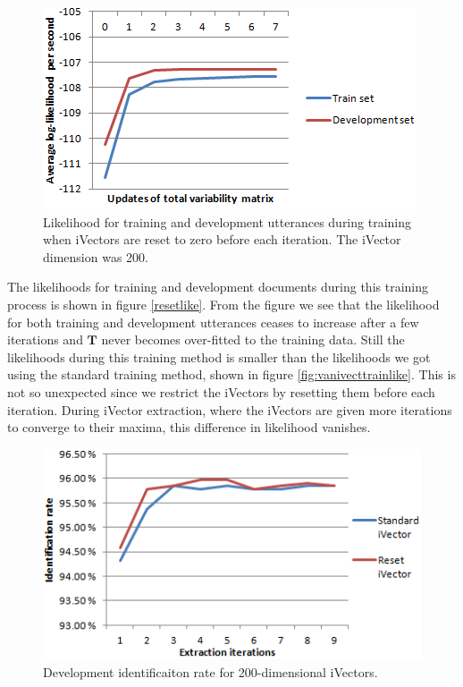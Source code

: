 \begin{figure}[hbt]
	\begin{center}
	\includegraphics{figures/resetlike.png}
	\caption{Likelihood for training and development utterances during training when iVectors are reset to zero before each iteration. The iVector dimension was 200.}
	\label{fig:resetlike}
	\end{center}
\end{figure}

The likelihoods for training and development documents during this training process is shown in figure \ref{resetlike}. From the figure we see that the likelihood for both training and development utterances ceases to increase after a few iterations and $\mathbf{T}$ never becomes over-fitted to the training data. Still the likelihoods during this training method is smaller than the likelihoods we got using the standard training method, shown in figure \ref{fig:vanivecttrainlike}. This is not so unexpected since we restrict the iVectors by resetting them before each iteration. During iVector extraction, where the iVectors are given more iterations to converge to their maxima, this difference in likelihood vanishes.

\begin{figure}[hbt]
	\begin{center}
	\includegraphics{figures/resetidentification.png}
	\caption{Development identificaiton rate for 200-dimensional iVectors.}
	\label{fig:resetidrate}
	\end{center}
\end{figure}

